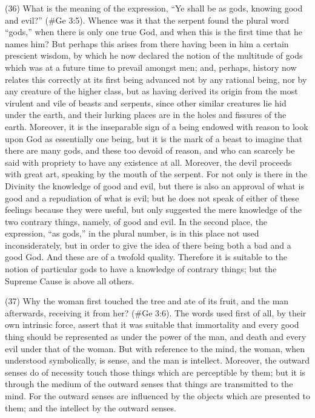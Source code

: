 (36) What is the meaning of the expression, ``Ye shall be as gods, knowing good and evil?''
(\#Ge 3:5). Whence was it that the serpent found the plural word ``gods,'' when there is only one
true God, and when this is the first time that he names him? But perhaps this arises from there
having been in him a certain prescient wisdom, by which he now declared the notion of the
multitude of gods which was at a future time to prevail amongst men; and, perhaps, history now
relates this correctly at its first being advanced not by any rational being, nor by any creature of the
higher class, but as having derived its origin from the most virulent and vile of beasts and serpents,
since other similar creatures lie hid under the earth, and their lurking places are in the holes and
fissures of the earth. Moreover, it is the inseparable sign of a being endowed with reason to look
upon God as essentially one being, but it is the mark of a beast to imagine that there are many
gods, and these too devoid of reason, and who can scarcely be said with propriety to have any
existence at all. Moreover, the devil proceeds with great art, speaking by the mouth of the serpent.
For not only is there in the Divinity the knowledge of good and evil, but there is also an approval of
what is good and a repudiation of what is evil; but he does not speak of either of these feelings
because they were useful, but only suggested the mere knowledge of the two contrary things,
namely, of good and evil. In the second place, the expression, ``as gods,'' in the plural number, is in
this place not used inconsiderately, but in order to give the idea of there being both a bad and a
good God. And these are of a twofold quality. Therefore it is suitable to the notion of particular
gods to have a knowledge of contrary things; but the Supreme Cause is above all others.

(37) Why the woman first touched the tree and ate of its fruit, and the man afterwards, receiving it
from her? (\#Ge 3:6). The words used first of all, by their own intrinsic force, assert that it was
suitable that immortality and every good thing should be represented as under the power of the
man, and death and every evil under that of the woman. But with reference to the mind, the woman,
when understood symbolically, is sense, and the man is intellect. Moreover, the outward senses do
of necessity touch those things which are perceptible by them; but it is through the medium of the
outward senses that things are transmitted to the mind. For the outward senses are influenced by
the objects which are presented to them; and the intellect by the outward senses.

